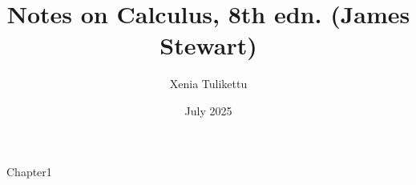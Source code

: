 \documentclass{article}
\title{Notes on Calculus, 8th edn. (James Stewart)}
\author{Xenia Tulikettu}
\date{July 2025} %
\begin{document}
\maketitle

\tableofcontents
\newpage
{Chapter1}
\end{document}
